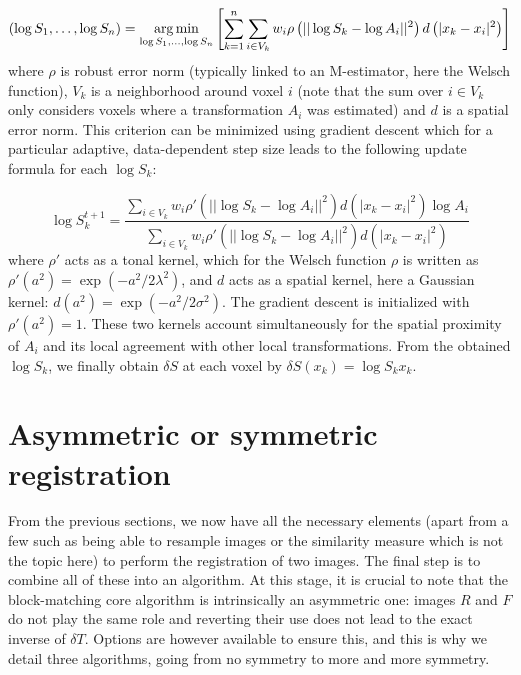 \documentclass[a4paper]{article}
\def\argmin{\operatornamewithlimits{arg\,min}}
\begin{document}
\begin{equation}
	\left( \log S_1,\ldots,\log S_n \right) = \argmin_{\log S_1,\ldots,\log S_n} \left[ \sum_{k=1}^n \sum_{i \in V_k} w_i \rho\left( || \log S_k - \log A_i||^2 \right) d\left( |x_k - x_i|^2 \right) \right]
\end{equation}
where $\rho$ is robust error norm (typically linked to an M-estimator, here the Welsch function), $V_k$ is a neighborhood around voxel $i$ (note that the sum over $i \in V_k$ only considers voxels where a transformation $A_i$ was estimated) and $d$ is a spatial error norm. This criterion can be minimized using gradient descent which for a particular adaptive, data-dependent step size leads to the following update formula for each $\log S_k$:

\begin{equation}
	\log S_k^{t+1} = \frac{\sum_{i \in V_k} w_i \rho'\left( || \log S_k - \log A_i||^2 \right)d\left( |x_k - x_i|^2 \right) \log A_i}{\sum_{i \in V_k} w_i \rho'\left( || \log S_k - \log A_i||^2 \right)d\left( |x_k - x_i|^2 \right)}
\end{equation}
where $\rho'$ acts as a tonal kernel, which for the Welsch function $\rho$ is written as $\rho'(a^2) = \exp\left(-a^2 / 2\lambda^2\right)$, and $d$ acts as a spatial kernel, here a Gaussian kernel: $d(a^2) = \exp\left(- a^2 / 2\sigma^2\right)$. The gradient descent is initialized with $\rho'(a^2) = 1$. These two kernels account simultaneously for the spatial proximity of $A_i$ and its local agreement with other local transformations. From the obtained $\log S_k$, we finally obtain $\delta S$ at each voxel by $\delta S(x_k) = \log S_k x_k$.


\section{Asymmetric or symmetric registration}
\label{sec:reg-algorithms}

From the previous sections, we now have all the necessary elements (apart from a few such as being able to resample images or the similarity measure which is not the topic here) to perform the registration of two images. The final step is to combine all of these into an algorithm. At this stage, it is crucial to note that the block-matching core algorithm is intrinsically an asymmetric one: images $R$ and $F$ do not play the same role and reverting their use does not lead to the exact inverse of $\delta T$. Options are however available to ensure this, and this is why we detail three algorithms, going from no symmetry to more and more symmetry.
\end{document}

